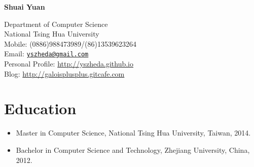 \documentclass[letterpaper]{article}
\def\name{Shuai Yuan}
\begin{document}
\centerline{\huge\bf \name} \vspace{0.25in}
\begin{minipage}[t]{0.8\textwidth}
Department of Computer Science \\
National Tsing Hua University \\
Mobile: (0886)988473989/(86)13539623264   \\
Email: \href{mailto:yszheda@gmail.com}{\tt yszheda@gmail.com}\\
Personal Profile: \url{http://yszheda.github.io} \\
Blog: \url{http://galoisplusplus.gitcafe.com}
\end{minipage}

\section*{Education}
\begin{itemize}
\item Master in Computer Science, National Tsing Hua University, Taiwan, 2014.
\item Bachelor in Computer Science and Technology, Zhejiang University, China, 2012.
\end{itemize}
\end{document}

